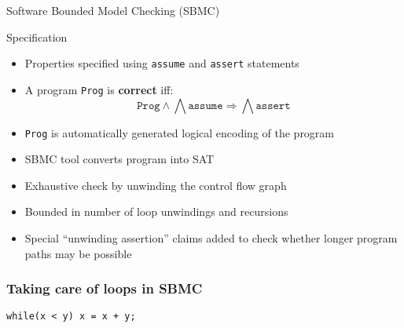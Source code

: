 \documentclass[french,english]{beamer}
\begin{document}
\begin{frame}{Software Bounded Model Checking (SBMC)}
	\begin{block}{Specification}
		\begin{itemize}
			\item Properties specified using \texttt{assume} and \texttt{assert} statements
			\item A program \texttt{Prog} is \textbf{correct} iff:
			\[ \texttt{Prog} \wedge \bigwedge \texttt{assume} \Rightarrow \bigwedge \texttt{assert} \]
			\item \texttt{Prog} is automatically generated logical encoding of the program
		\end{itemize}
	\end{block}
	\begin{itemize}
		\item SBMC tool converts program into SAT
		\item Exhaustive check by unwinding the control flow graph
		\item Bounded in number of loop unwindings and recursions
		\item Special “unwinding assertion” claims added to check whether longer program paths may be possible
	\end{itemize}
\end{frame}

\begin{frame}
	\frametitle{Taking care of loops in SBMC}
	\texttt{while(x < y) x = x + y;}
	
\end{frame}
\end{document}

